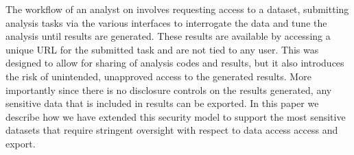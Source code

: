 The workflow of an analyst on \NAME involves requesting access to a dataset, submitting analysis
tasks via the various interfaces \cite{babuji2017enabling} to interrogate the data and tune the analysis until results are generated.
These results are available by accessing a unique URL for the submitted task and are not tied to any user.
This was designed to allow for sharing of analysis codes and results, but it also introduces the risk
of unintended, unapproved access to the generated results. More importantly since there is no disclosure
controls on the results generated, any sensitive data that is included in results can be exported.
In this paper we describe how we have extended this security model to support the most sensitive datasets
that require stringent oversight with respect to data access access and export.



